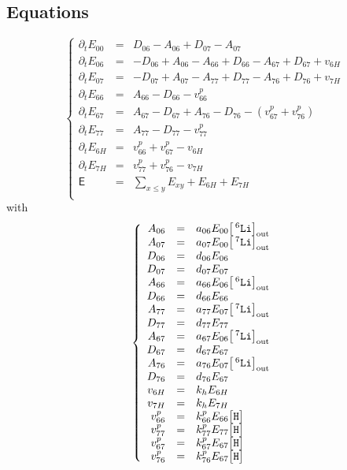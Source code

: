 \documentclass[aps,onecolumn,11pt]{revtex4}
\newcommand{\mychem}[1]{\mathtt{#1}}
\newcommand{\myconc}[1]{\big[#1\big]}
\newcommand{\spLi}[1]{{\!~^{#1}\mychem{Li}}}
\newcommand{\Li}[1]{\myconc{\spLi{#1}}}
\newcommand{\spproton}{\mychem{H}}
\newcommand{\proton}{\myconc{\spproton}}
\newcommand{\myout}[1]{{#1}_{\tiny\mathrm{out}}}
\newcommand{\LiOut}[1]{\myout{\Li{#1}}}
\begin{document}
\subsection{Equations}
\begin{equation}
\left\lbrace
\begin{array}{rcl}
\partial_t E_{00} & = & D_{06}-A_{06} + D_{07}-A_{07}\\
\partial_t E_{06} & = & -D_{06}+A_{06} - A_{66} + D_{66} - A_{67} + D_{67} + v_{6H}\\
\partial_t E_{07} & = & -D_{07}+A_{07} - A_{77} + D_{77} - A_{76} + D_{76} + v_{7H}\\
\partial_t E_{66} & = & A_{66}-D_{66} -v^p_{66}\\
\partial_t E_{67} & = & A_{67}-D_{67} + A_{76}-D_{76} - (v^p_{67}+v^p_{76})\\
\partial_t E_{77} & = & A_{77}-D_{77} - v^p_{77}\\
\partial_t E_{6H} & = & v^p_{66}+v^p_{67} - v_{6H}\\
\partial_t E_{7H} & = & v^p_{77}+v^p_{76} - v_{7H}\\
\mathsf{E}      & = & {\displaystyle \sum_{x\leq y} E_{xy}}+E_{6H}+E_{7H}\\
\end{array}
\right.
\end{equation}
with
\begin{equation}
\left\lbrace
\begin{array}{rcl}
A_{06}   & = & a_{06} E_{00} \LiOut{6}\\
A_{07}   & = & a_{07} E_{00} \LiOut{7}\\
D_{06}   & = & d_{06} E_{06}\\
D_{07}   & = & d_{07} E_{07}\\
A_{66}   & = & a_{66} E_{06} \LiOut{6} \\
D_{66}   & = & d_{66} E_{66}\\
A_{77}   & = & a_{77} E_{07} \LiOut{7} \\
D_{77}   & = & d_{77} E_{77}\\
A_{67}   & = & a_{67} E_{06} \LiOut{7}\\
D_{67}   & = & d_{67} E_{67}\\
A_{76}   & = & a_{76} E_{07} \LiOut{6}\\
D_{76}   & = & d_{76} E_{67}\\
v_{6H}   & = & k_h E_{6H}\\
v_{7H}   & = & k_h E_{7H}\\
v^p_{66} & = & k^p_{66} E_{66} \proton \\
v^p_{77} & = & k^p_{77} E_{77} \proton \\
v^p_{67} & = & k^p_{67} E_{67} \proton \\
v^p_{76} & = & k^p_{76} E_{67} \proton \\
\end{array}
\right.
\end{equation}
\end{document}
